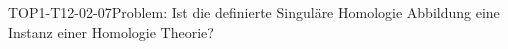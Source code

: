 
\begin{REM}{TOP1-T12-02-07}{Problem: Ist die definierte Singuläre Homologie Abbildung eine Instanz einer Homologie Theorie?}
\end{REM}
